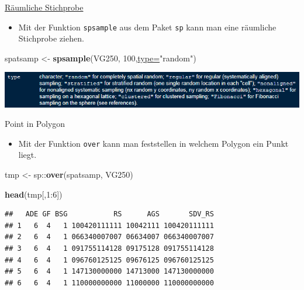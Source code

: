 \documentclass[ignorenonframetext,]{beamer}
\newenvironment{Shaded}{\begin{snugshade}}{\end{snugshade}}
\newcommand{\DataTypeTok}[1]{\textcolor[rgb]{0.74,0.68,0.62}{\underline{#1}}}
\newcommand{\DecValTok}[1]{\textcolor[rgb]{0.27,0.67,0.26}{#1}}
\newcommand{\KeywordTok}[1]{\textcolor[rgb]{0.26,0.66,0.93}{\textbf{#1}}}
\newcommand{\NormalTok}[1]{\textcolor[rgb]{0.74,0.68,0.62}{#1}}
\newcommand{\OperatorTok}[1]{\textcolor[rgb]{0.74,0.68,0.62}{#1}}
\newcommand{\StringTok}[1]{\textcolor[rgb]{0.02,0.61,0.04}{#1}}
\providecommand{\tightlist}{%
  \setlength{\itemsep}{0pt}\setlength{\parskip}{0pt}}
\begin{document}
\begin{frame}[fragile]{\href{https://www.rdocumentation.org/packages/sp/versions/1.3-1/topics/spsample}{Räumliche
Stichprobe}}
\protect\hypertarget{raumliche-stichprobe}{}

\begin{itemize}
\tightlist
\item
  Mit der Funktion \texttt{spsample} aus dem Paket \texttt{sp} kann man
  eine räumliche Stichprobe ziehen.
\end{itemize}

\begin{Shaded}
\begin{Highlighting}[]
\NormalTok{spatsamp <-}\StringTok{ }\KeywordTok{spsample}\NormalTok{(VG250, }\DecValTok{100}\NormalTok{,}\DataTypeTok{type=}\StringTok{"random"}\NormalTok{)}
\end{Highlighting}
\end{Shaded}

\includegraphics{figure/spsample_type.PNG}

\end{frame}

\begin{frame}[fragile]{Point in Polygon}
\protect\hypertarget{point-in-polygon}{}

\begin{itemize}
\tightlist
\item
  Mit der Funktion \texttt{over} kann man feststellen in welchem Polygon
  ein Punkt liegt.
\end{itemize}

\begin{Shaded}
\begin{Highlighting}[]
\NormalTok{tmp <-}\StringTok{ }\NormalTok{sp}\OperatorTok{::}\KeywordTok{over}\NormalTok{(spatsamp, VG250)}
\end{Highlighting}
\end{Shaded}

\begin{Shaded}
\begin{Highlighting}[]
\KeywordTok{head}\NormalTok{(tmp[,}\DecValTok{1}\OperatorTok{:}\DecValTok{6}\NormalTok{])}
\end{Highlighting}
\end{Shaded}

\begin{verbatim}
##   ADE GF BSG           RS      AGS       SDV_RS
## 1   6  4   1 100420111111 10042111 100420111111
## 2   6  4   1 066340007007 06634007 066340007007
## 3   6  4   1 091755114128 09175128 091755114128
## 4   6  4   1 096760125125 09676125 096760125125
## 5   6  4   1 147130000000 14713000 147130000000
## 6   6  4   1 110000000000 11000000 110000000000
\end{verbatim}

\end{frame}
\end{document}

